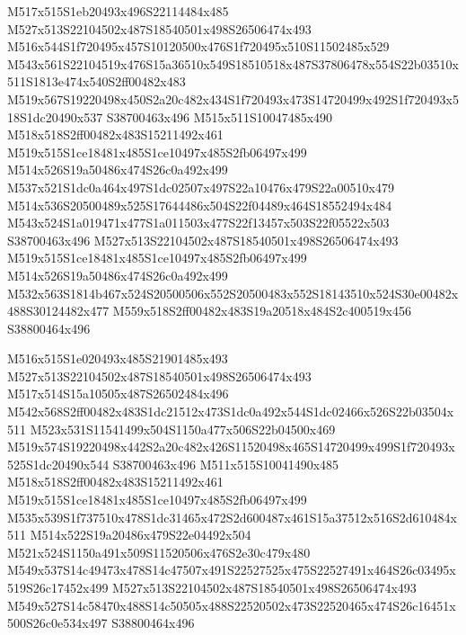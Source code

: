 \documentclass{article}
\begin{document}
\begin{multicols}{2}
M517x515S1eb20493x496S22114484x485 M527x513S22104502x487S18540501x498S26506474x493 M516x544S1f720495x457S10120500x476S1f720495x510S11502485x529 M543x561S22104519x476S15a36510x549S18510518x487S37806478x554S22b03510x511S1813e474x540S2ff00482x483 M519x567S19220498x450S2a20c482x434S1f720493x473S14720499x492S1f720493x518S1dc20490x537 S38700463x496 M515x511S10047485x490 M518x518S2ff00482x483S15211492x461 M519x515S1ce18481x485S1ce10497x485S2fb06497x499 M514x526S19a50486x474S26c0a492x499 M537x521S1dc0a464x497S1dc02507x497S22a10476x479S22a00510x479 M514x536S20500489x525S17644486x504S22f04489x464S18552494x484 M543x524S1a019471x477S1a011503x477S22f13457x503S22f05522x503 S38700463x496 M527x513S22104502x487S18540501x498S26506474x493 M519x515S1ce18481x485S1ce10497x485S2fb06497x499 M514x526S19a50486x474S26c0a492x499 M532x563S1814b467x524S20500506x552S20500483x552S18143510x524S30e00482x488S30124482x477 M559x518S2ff00482x483S19a20518x484S2c400519x456 S38800464x496

M516x515S1e020493x485S21901485x493 M527x513S22104502x487S18540501x498S26506474x493 M517x514S15a10505x487S26502484x496 M542x568S2ff00482x483S1dc21512x473S1dc0a492x544S1dc02466x526S22b03504x511 M523x531S11541499x504S1150a477x506S22b04500x469 M519x574S19220498x442S2a20c482x426S11520498x465S14720499x499S1f720493x525S1dc20490x544 S38700463x496 M511x515S10041490x485 M518x518S2ff00482x483S15211492x461 M519x515S1ce18481x485S1ce10497x485S2fb06497x499 M535x539S1f737510x478S1dc31465x472S2d600487x461S15a37512x516S2d610484x511 M514x522S19a20486x479S22e04492x504 M521x524S1150a491x509S11520506x476S2e30c479x480 M549x537S14c49473x478S14c47507x491S22527525x475S22527491x464S26c03495x519S26c17452x499 M527x513S22104502x487S18540501x498S26506474x493 M549x527S14c58470x488S14c50505x488S22520502x473S22520465x474S26c16451x500S26c0e534x497 S38800464x496


\end{multicols}
\end{document}
